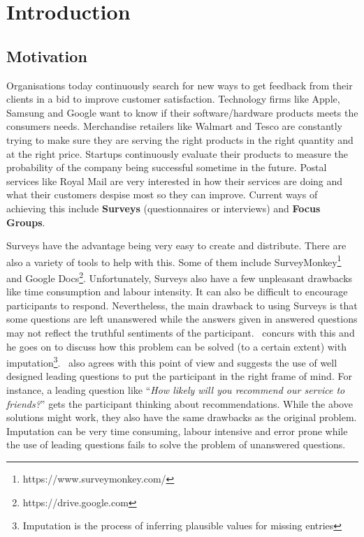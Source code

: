 
\chapter{Introduction}
\label{cha:introduction}

\section{Motivation}
\label{sec:motivation}
Organisations today continuously search for new ways to get feedback from their clients in a bid to
improve customer satisfaction. Technology firms like Apple, Samsung and Google want to know if their
software/hardware products meets the consumers needs.  Merchandise retailers like Walmart and Tesco
are constantly trying to make sure they are serving the right products in the right quantity and at
the right price. Startups continuously evaluate their products to measure the probability of the
company being successful sometime in the future. Postal services like Royal Mail are very interested
in how their services are doing and what their customers despise most so they can improve. Current
ways of achieving this include \textbf{Surveys} (questionnaires or interviews) and \textbf{Focus
Groups}.

Surveys have the advantage being very easy to create and distribute. There are also a variety of
tools to help with this. Some of them include SurveyMonkey\footnote{https://www.surveymonkey.com/}
and Google Docs\footnote{https://drive.google.com}. Unfortunately, Surveys also have a few
unpleasant drawbacks like time consumption and labour intensity. It can also be difficult to
encourage participants to respond. Nevertheless, the main drawback to using Surveys is that some
questions are left unanswered while the answers given in answered questions may not reflect the
truthful sentiments of the participant.~\cite{rubin1987} concurs with this and he goes on to
discuss how this problem can be solved (to a certain extent) with imputation\footnote{Imputation is
the process of inferring plausible values for missing entries}.~\cite{hayes2008} also agrees
with this point of view and suggests the use of well designed leading questions to put the
participant in the right frame of mind. For instance, a leading question like ``\textit{How likely
will you recommend our service to friends?}'' gets the participant thinking about recommendations.
While the above solutions might work, they also have the same drawbacks as the original problem.
Imputation can be very time consuming, labour intensive and error prone while the use of leading
questions fails to solve the problem of unanswered questions.

